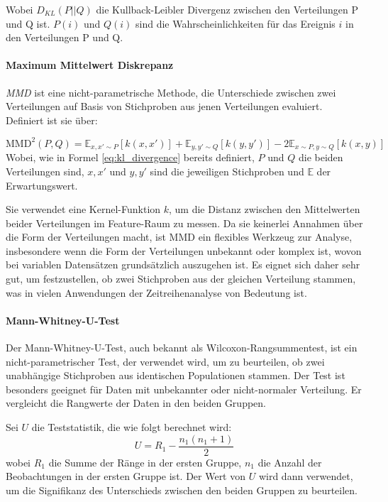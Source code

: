 Wobei \(D_{KL}(P || Q)\) die Kullback-Leibler Divergenz zwischen den Verteilungen P und Q ist. 
\(P(i)\) und \(Q(i)\) sind die Wahrscheinlichkeiten für das Ereignis \(i\) in den Verteilungen P und Q.


\paragraph{Maximum Mittelwert Diskrepanz}
\textit{\acf{MMD}} ist eine nicht-parametrische Methode, die Unterschiede zwischen zwei Verteilungen auf Basis von Stichproben aus jenen Verteilungen evaluiert.
Definiert ist sie über:

\begin{equation}
    \text{MMD}^2(P, Q) = \mathbb{E}_{x,x' \sim P}[k(x, x')] + \mathbb{E}_{y,y' \sim Q}[k(y, y')] - 2\mathbb{E}_{x \sim P, y \sim Q}[k(x, y)]
\end{equation}
Wobei, wie in Formel \ref{eq:kl_divergence} bereits definiert, \(P\) und \(Q\) die beiden Verteilungen sind, \(x,x'\) und \(y,y'\) sind die jeweiligen Stichproben und \(\mathbb{E}\) der Erwartungswert.

Sie verwendet eine Kernel-Funktion \(k\), um die Distanz zwischen den Mittelwerten beider Verteilungen im Feature-Raum zu messen. 
Da sie keinerlei Annahmen über die Form der Verteilungen macht, ist \ac{MMD} ein flexibles Werkzeug zur Analyse, insbesondere wenn die Form der Verteilungen unbekannt oder komplex ist, wovon bei variablen Datensätzen grundsätzlich auszugehen ist.
Es eignet sich daher sehr gut, um festzustellen, ob zwei Stichproben aus der gleichen Verteilung stammen, was in vielen Anwendungen der Zeitreihenanalyse von Bedeutung ist.


\paragraph{Mann-Whitney-U-Test}
Der Mann-Whitney-U-Test, auch bekannt als Wilcoxon-Rangsummentest, ist ein nicht-parametrischer Test, der verwendet wird, um zu beurteilen, ob zwei unabhängige Stichproben aus identischen Populationen stammen. Der Test ist besonders geeignet für Daten mit unbekannter oder nicht-normaler Verteilung. Er vergleicht die Rangwerte der Daten in den beiden Gruppen.

Sei \( U \) die Teststatistik, die wie folgt berechnet wird:
\begin{equation}
    U = R_1 - \frac{n_1(n_1+1)}{2}
\end{equation}
wobei \( R_1 \) die Summe der Ränge in der ersten Gruppe, \( n_1 \) die Anzahl der Beobachtungen in der ersten Gruppe ist. Der Wert von \( U \) wird dann verwendet, um die Signifikanz des Unterschieds zwischen den beiden Gruppen zu beurteilen.

